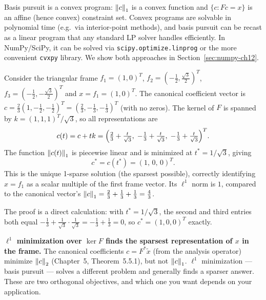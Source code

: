 \begin{remark*}
Basis pursuit is a convex program: $\left\| c \right\|_1$ is a convex function
and $\{c : Fc = x\}$ is an affine (hence convex) constraint set.
Convex programs are solvable in polynomial time (e.g.\ via interior-point
methods), and basis pursuit can be recast as a linear program that any
standard LP solver handles efficiently. In NumPy/SciPy, it can be
solved via \texttt{scipy.optimize.linprog} or the more convenient
\texttt{cvxpy} library. We show both approaches in
Section~\ref{sec:numpy-ch12}.
\end{remark*}

\begin{examplebox}[title={Example 12.1: The triangular frame --- $\ell^1$ finds the sparsest expansion}]
\label{ex:triangular-sparsity}
Consider the triangular frame $f_1=(1,0)^T$, $f_2=(-\tfrac12,\tfrac{\sqrt3}{2})^T$,
$f_3=(-\tfrac12,-\tfrac{\sqrt3}{2})^T$ and $x = f_1 = (1,0)^T$. The
canonical coefficient vector is $c = \tfrac{2}{3}(1,-\tfrac12,-\tfrac12)^T
= (\tfrac23,-\tfrac13,-\tfrac13)^T$ (with no zeros). The kernel of $F$
is spanned by $k = (1,1,1)^T/\sqrt3$, so all representations are
\[
  c(t) = c + tk =
  \Bigl(\tfrac23 + \tfrac{t}{\sqrt3},\;
        -\tfrac13 + \tfrac{t}{\sqrt3},\;
        -\tfrac13 + \tfrac{t}{\sqrt3}\Bigr)^T.
\]
The function $\left\| c(t) \right\|_1$ is piecewise linear and is minimized at
$t^* = 1/\sqrt3$, giving
\[
  c^* = c(t^*) = (1,\,0,\,0)^T.
\]
This is the unique 1-sparse solution (the sparsest possible), correctly
identifying $x = f_1$ as a scalar multiple of the first frame vector.
Its $\ell^1$ norm is $1$, compared to the canonical vector's
$\left\| c \right\|_1 = \tfrac23+\tfrac13+\tfrac13=\tfrac43$.

The proof is a direct calculation: with $t^*=1/\sqrt3$, the second and
third entries both equal $-\tfrac13+\tfrac{1}{\sqrt3}\cdot\tfrac{1}{\sqrt3}
= -\tfrac13+\tfrac13 = 0$, so $c^* = (1,0,0)^T$ exactly.
\end{examplebox}

\begin{keyidea}
\textbf{$\ell^1$ minimization over $\ker F$ finds the sparsest
representation of $x$ in the frame.} The canonical coefficients
$c=F^*\tilde x$ (from the analysis operator) minimize
$\left\| c \right\|_2$ (Chapter~5, Theorem~5.5.1), but not $\left\| c \right\|_1$.
$\ell^1$ minimization --- basis pursuit --- solves a different problem
and generally finds a sparser answer. These are two orthogonal
objectives, and which one you want depends on your application.
\end{keyidea}

